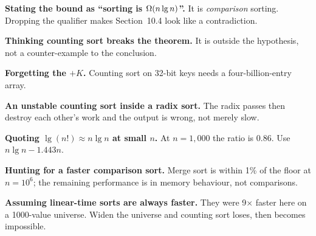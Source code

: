 \begin{pitfall}
\begin{tight}
  \item \textbf{Stating the bound as ``sorting is $\Omega(n\operatorname{lg} n)$''.} It is
        \emph{comparison} sorting. Dropping the qualifier makes
        Section~10.4 look like a contradiction.
  \item \textbf{Thinking counting sort breaks the theorem.} It is outside the
        hypothesis, not a counter-example to the conclusion.
  \item \textbf{Forgetting the $+K$.} Counting sort on 32-bit keys needs a
        four-billion-entry array.
  \item \textbf{An unstable counting sort inside a radix sort.} The radix
        passes then destroy each other's work and the output is wrong, not
        merely slow.
  \item \textbf{Quoting $\lg(n!) \approx n \lg n$ at small $n$.} At
        $n = 1{,}000$ the ratio is 0.86. Use $n\lg n - 1.443n$.
  \item \textbf{Hunting for a faster comparison sort.} Merge sort is within 1\%
        of the floor at $n = 10^{6}$; the remaining performance is in memory
        behaviour, not comparisons.
  \item \textbf{Assuming linear-time sorts are always faster.} They were 9×
        faster here on a 1000-value universe. Widen the universe and counting
        sort loses, then becomes impossible.
\end{tight}
\end{pitfall}

